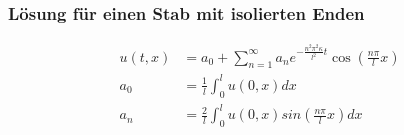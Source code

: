 \subsubsection{Lösung für einen Stab mit isolierten Enden}
\[
\begin{aligned}
    u(t,x)
    &=
    a_{0} + \sum_{n=1}^{\infty}a_{n}e^{-\frac{n^{2}\pi^{2}\kappa}{l^{2}}t}
    \cos\left(\frac{n\pi}{l}x\right)
    \\
    a_{0}
    &=
    \frac{1}{l}\int_{0}^{l}u(0,x) dx
    \\
    a_{n}
    &=
    \frac{2}{l}\int_{0}^{l}u(0,x)sin\left(\frac{n\pi}{l}x\right) dx
\end{aligned}
\]
